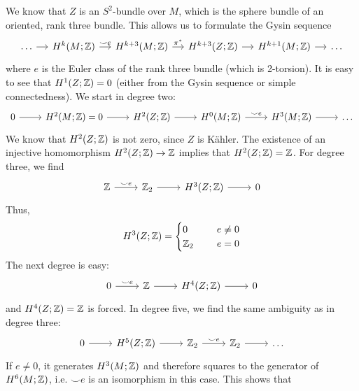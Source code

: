 \documentclass{scrartcl}
\begin{document}
We know that $Z$ is an $S^2$-bundle over $M$, which is the sphere bundle of an oriented, rank three bundle. This allows us to formulate the Gysin sequence
\begin{equation*}
	\begin{tikzcd}[column sep=small]
		\dots \ar[r] & H^k(M;\Z) \ar[r,"\smile e"] & H^{k+3}(M;\Z) \ar[r,"\pi^*"] & H^{k+3}(Z;\Z) \ar[r] & H^{k+1}(M;\Z) \ar[r] & \dots
	\end{tikzcd}
\end{equation*}
where $e$ is the Euler class of the rank three bundle (which is 2-torsion). It is easy to see that $H^1(Z;\mathbb{Z})=0$ (either from the Gysin sequence or simple connectedness). We start in degree two:
\begin{equation*}
	\begin{tikzcd}
		0\ar[r] & H^2(M;\Z)=0\ar[r] & H^2(Z;\Z) \ar[r] & H^0(M;\Z) \ar[r,"\smile e"] 
		& H^3(M;\Z) \ar[r] & \dots
	\end{tikzcd}
\end{equation*}
We know that $H^2(Z;\mathbb{Z})$ is not zero, since $Z$ is K\"ahler. The existence of an injective homomorphism $H^2(Z;\mathbb{Z})\to\mathbb{Z}$ implies that $H^2(Z;\mathbb{Z})=\mathbb{Z}$. For degree three, we find
\begin{equation*}
	\begin{tikzcd}
		\Z\ar[r,"\smile e"] & \Z_2 \ar[r] & H^3(Z;\Z) \ar[r] & 0
	\end{tikzcd}
\end{equation*}
Thus, 
\begin{equation*}
	H^3(Z;\mathbb{Z})=
	\begin{cases}
		0 \qquad & e\neq 0\\
		\mathbb{Z}_2 & e=0
	\end{cases}
\end{equation*}
The next degree is easy:
\begin{equation*}
	\begin{tikzcd}
		0\ar[r,"\smile e"] & \Z\ar[r] & H^4(Z;\Z) \ar[r] & 0
	\end{tikzcd}
\end{equation*}
and $H^4(Z;\mathbb{Z})=\mathbb{Z}$ is forced. In degree five, we find the same ambiguity as in degree three:
\begin{equation*}
	\begin{tikzcd}
		0\ar[r] & H^5(Z;\Z) \ar[r] & \Z_2 \ar[r,"\smile e"] & \Z_2 \ar[r] & \dots
	\end{tikzcd}
\end{equation*}
If $e\neq 0$, it generates $H^3(M;\mathbb{Z})$ and therefore squares to the generator of $H^6(M;\mathbb{Z})$, i.e. $\smile e$ is an isomorphism in this case. This shows that
\end{document}
